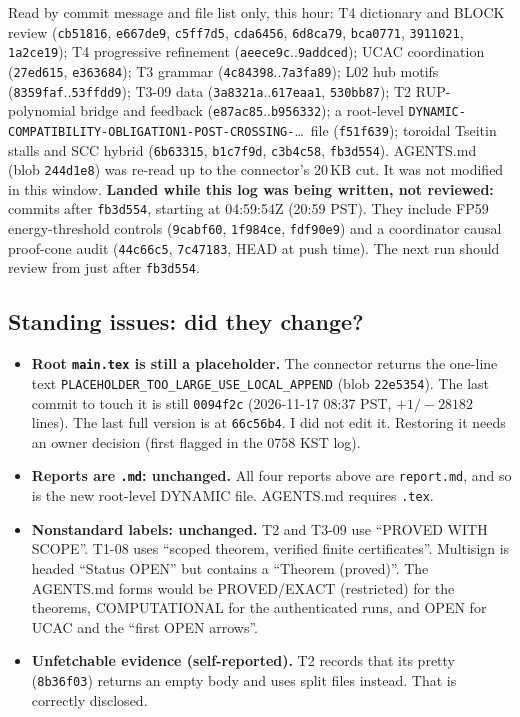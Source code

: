 \documentclass[11pt]{article}
\theoremstyle{definition}
\theoremstyle{remark}
\begin{document}
Read by commit message and file list only, this hour: T4 dictionary and BLOCK review
(\texttt{cb51816}, \texttt{e667de9}, \texttt{c5ff7d5}, \texttt{cda6456}, \texttt{6d8ca79},
\texttt{bca0771}, \texttt{3911021}, \texttt{1a2ce19}); T4 progressive refinement
(\texttt{aeece9c}..\texttt{9addced}); UCAC coordination (\texttt{27ed615}, \texttt{e363684});
T3 grammar (\texttt{4c84398}..\texttt{7a3fa89}); L02 hub motifs (\texttt{8359faf}..\texttt{53ffdd9});
T3-09 data (\texttt{3a8321a}..\texttt{617eaa1}, \texttt{530bb87}); T2 RUP-polynomial bridge and
feedback (\texttt{e87ac85}..\texttt{b956332}); a root-level
\texttt{DYNAMIC-COMPATIBILITY-}\allowbreak\texttt{OBLIGATION1-}\allowbreak\texttt{POST-CROSSING-}\allowbreak\ldots\ file
(\texttt{f51f639}); toroidal Tseitin stalls and SCC hybrid (\texttt{6b63315},
\texttt{b1c7f9d}, \texttt{c3b4c58}, \texttt{fb3d554}). AGENTS.md (blob \texttt{244d1e8}) was
re-read up to the connector's 20\,KB cut. It was not modified in this window.
\textbf{Landed while this log was being written, not reviewed:} commits after
\texttt{fb3d554}, starting at 04:59:54Z (20:59 PST). They include FP59 energy-threshold
controls (\texttt{9cabf60}, \texttt{1f984ce}, \texttt{fdf90e9}) and a coordinator causal
proof-cone audit (\texttt{44c66c5}, \texttt{7c47183}, HEAD at push time). The next run should
review from just after \texttt{fb3d554}.

\subsection{Standing issues: did they change?}
\begin{itemize}
\item \textbf{Root \texttt{main.tex} is still a placeholder.} The connector returns the
one-line text \texttt{PLACEHOLDER\_TOO\_LARGE\_USE\_LOCAL\_APPEND} (blob \texttt{22e5354}).
The last commit to touch it is still \texttt{0094f2c} (2026-11-17 08:37 PST, $+1/-28182$
lines). The last full version is at \texttt{66c56b4}. I did not edit it. Restoring it needs
an owner decision (first flagged in the 0758 KST log).
\item \textbf{Reports are \texttt{.md}: unchanged.} All four reports above are
\texttt{report.md}, and so is the new root-level DYNAMIC file. AGENTS.md requires
\texttt{.tex}.
\item \textbf{Nonstandard labels: unchanged.} T2 and T3-09 use ``PROVED WITH SCOPE''. T1-08
uses ``scoped theorem, verified finite certificates''. Multisign is headed ``Status OPEN'' but
contains a ``Theorem (proved)''. The AGENTS.md forms would be PROVED/EXACT (restricted) for the
theorems, COMPUTATIONAL for the authenticated runs, and OPEN for UCAC and the ``first OPEN
arrows''.
\item \textbf{Unfetchable evidence (self-reported).} T2 records that its pretty
 (\texttt{8b36f03}) returns an empty body and uses split files instead.
That is correctly disclosed.
\end{itemize}
\end{document}
